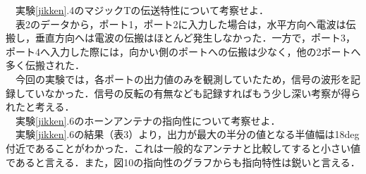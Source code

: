 　実験\ref{jikken}.4のマジックTの伝送特性について考察せよ．\\
　表2のデータから，ポート1，ポート2に入力した場合は，水平方向へ電波は伝搬し，垂直方向へは電波の伝搬はほとんど発生しなかった．一方で，ポート3，ポート4へ入力した際には，向かい側のポートへの伝搬は少なく，他の2ポートへ多く伝搬された．\\
　今回の実験では，各ポートの出力値のみを観測していたため，信号の波形を記録していなかった．信号の反転の有無なども記録すればもう少し深い考察が得られたと考える．\\

　実験\ref{jikken}.6のホーンアンテナの指向性について考察せよ．\\
　実験\ref{jikken}.6の結果（表3）より，出力が最大の半分の値となる半値幅は18deg付近であることがわかった．これは一般的なアンテナと比較してすると小さい値であると言える．また，図10の指向性のグラフからも指向特性は鋭いと言える．\\

  
